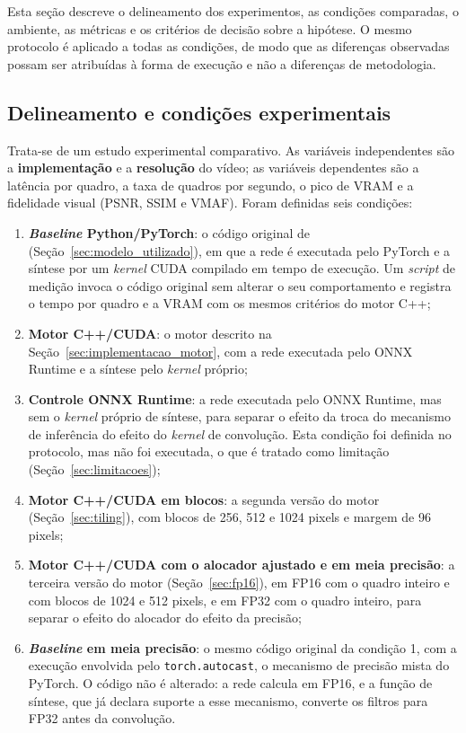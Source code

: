 \documentclass[
    12pt,                %
    openright,           %
    oneside,             %
    a4paper,             %
    english,             %
    brazil               %
]{abntex2}
\begin{document}
Esta seção descreve o delineamento dos experimentos, as condições comparadas, o ambiente, as métricas e os critérios de decisão sobre a hipótese. O mesmo protocolo é aplicado a todas as condições, de modo que as diferenças observadas possam ser atribuídas à forma de execução e não a diferenças de metodologia.

\subsection{Delineamento e condições experimentais}
\label{sec:condicoes}

Trata-se de um estudo experimental comparativo. As variáveis independentes são a \textbf{implementação} e a \textbf{resolução} do vídeo; as variáveis dependentes são a latência por quadro, a taxa de quadros por segundo, o pico de VRAM e a fidelidade visual (PSNR, SSIM e VMAF). Foram definidas seis condições:

\begin{enumerate}
    \item \textbf{\textit{Baseline} Python/PyTorch}: o código original de  (Seção~\ref{sec:modelo_utilizado}), em que a rede é executada pelo PyTorch e a síntese por um \textit{kernel} CUDA compilado em tempo de execução. Um \textit{script} de medição invoca o código original sem alterar o seu comportamento e registra o tempo por quadro e a VRAM com os mesmos critérios do motor C++;
    \item \textbf{Motor C++/CUDA}: o motor descrito na Seção~\ref{sec:implementacao_motor}, com a rede executada pelo ONNX Runtime e a síntese pelo \textit{kernel} próprio;
    \item \textbf{Controle ONNX Runtime}: a rede executada pelo ONNX Runtime, mas sem o \textit{kernel} próprio de síntese, para separar o efeito da troca do mecanismo de inferência do efeito do \textit{kernel} de convolução. Esta condição foi definida no protocolo, mas não foi executada, o que é tratado como limitação (Seção~\ref{sec:limitacoes});
    \item \textbf{Motor C++/CUDA em blocos}: a segunda versão do motor (Seção~\ref{sec:tiling}), com blocos de 256, 512 e 1024 pixels e margem de 96 pixels;
    \item \textbf{Motor C++/CUDA com o alocador ajustado e em meia precisão}: a terceira versão do motor (Seção~\ref{sec:fp16}), em FP16 com o quadro inteiro e com blocos de 1024 e 512 pixels, e em FP32 com o quadro inteiro, para separar o efeito do alocador do efeito da precisão;
    \item \textbf{\textit{Baseline} em meia precisão}: o mesmo código original da condição 1, com a execução envolvida pelo \texttt{torch.autocast}, o mecanismo de precisão mista do PyTorch. O código não é alterado: a rede calcula em FP16, e a função de síntese, que já declara suporte a esse mecanismo, converte os filtros para FP32 antes da convolução.
\end{enumerate}
\end{document}
